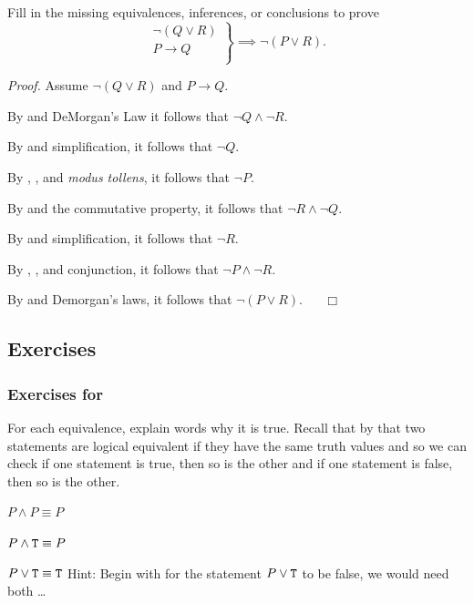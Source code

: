 \begin{exam}
\label{exam_proof_equiv_infer}
    Fill in the missing equivalences, inferences, or conclusions to prove 
            $$\left. \begin{array} {cc}
            \neg(Q \lor R) \\
            P \to Q \\
            \end{array} \right\} \implies \neg (P \lor R).$$

    \emph{Proof.}
        Assume  $\neg(Q \lor R)$ and  $P \to Q$.
        
        By  and DeMorgan's Law it follows that  $\neg Q \land \neg R$.
        
        By  and simplification, it follows that  $\neg Q$.

        By , , and \emph{modus tollens}, it follows that  $\neg P$.

        By  and the commutative property, it follows that  $\neg R \land \neg Q$.

        By  and simplification, it follows that  $\neg R$.

        By , , and conjunction, it follows that  $\neg P \land \neg R$.

        By  and Demorgan's laws, it follows that $\neg(P \lor R)$. ~ \hfill ~$\Box$ 
\end{exam}

\subsection{Exercises}


\subsubsection*{Exercises for  \subequiv}

\begin{exer}[\exerP] %
\label{exer_understanding_equiv_negTF}
    For each equivalence, explain words why it is true.  Recall that by  that two statements are logical equivalent if they have the same truth values and so we can check if one statement is true, then so is the other and if one statement is false, then so is the other.  
        \begin{exerpart}
            \item $P \land P \equiv P$           
            \item $P \land \texttt{T}  \equiv P$ 
            \item $P \lor \texttt{T} \equiv \texttt{T}$  Hint: Begin with for the statement $P \lor \texttt{T}$ to be false, we would need both \ldots
        \end{exerpart}   
\end{exer}

